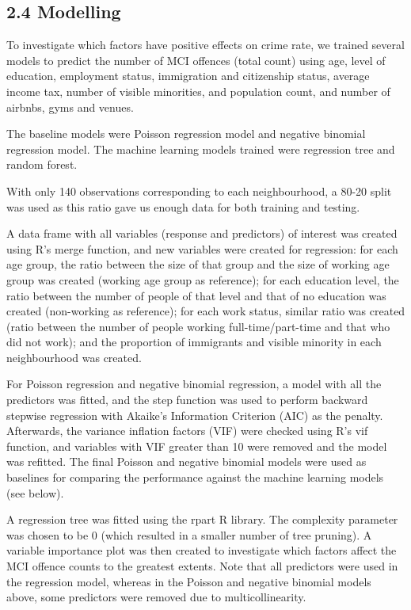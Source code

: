 \documentclass[
]{article}
\begin{document}
\hypertarget{modelling}{%
\subsection{2.4 Modelling}\label{modelling}}

To investigate which factors have positive effects on crime rate, we
trained several models to predict the number of MCI offences (total
count) using age, level of education, employment status, immigration and
citizenship status, average income tax, number of visible minorities,
and population count, and number of airbnbs, gyms and venues.

The baseline models were Poisson regression model and negative binomial
regression model. The machine learning models trained were regression
tree and random forest.

With only 140 observations corresponding to each neighbourhood, a 80-20
split was used as this ratio gave us enough data for both training and
testing.

A data frame with all variables (response and predictors) of interest
was created using R's merge function, and new variables were created for
regression: for each age group, the ratio between the size of that group
and the size of working age group was created (working age group as
reference); for each education level, the ratio between the number of
people of that level and that of no education was created (non-working
as reference); for each work status, similar ratio was created (ratio
between the number of people working full-time/part-time and that who
did not work); and the proportion of immigrants and visible minority in
each neighbourhood was created.

For Poisson regression and negative binomial regression, a model with
all the predictors was fitted, and the step function was used to perform
backward stepwise regression with Akaike's Information Criterion (AIC)
as the penalty. Afterwards, the variance inflation factors (VIF) were
checked using R's vif function, and variables with VIF greater than 10
were removed and the model was refitted. The final Poisson and negative
binomial models were used as baselines for comparing the performance
against the machine learning models (see below).

A regression tree was fitted using the rpart R library. The complexity
parameter was chosen to be 0 (which resulted in a smaller number of tree
pruning). A variable importance plot was then created to investigate
which factors affect the MCI offence counts to the greatest extents.
Note that all predictors were used in the regression model, whereas in
the Poisson and negative binomial models above, some predictors were
removed due to multicollinearity.
\end{document}

